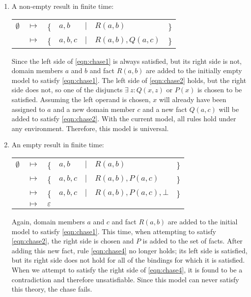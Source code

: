 		\begin{enumerate}
		\item A non-empty result in finite time:

			\begin{tabular}{lllllll}
				$\emptyset$ & $\mapsto$ & \{ & $a,b$   & $\mid$ & $R(a,b)$         & \} \\
				{}          & $\mapsto$ & \{ & $a,b,c$ & $\mid$ & $R(a,b), Q(a,c)$ & \}
			\end{tabular}

			Since the left side of \eqref{eqn:chase1} is always satisfied, but
			its right side is not, domain members $a$ and $b$ and fact $R(a,b)$
			are added to the initially empty model to satisfy \eqref{eqn:chase1}.
			The left side of \eqref{eqn:chase2} holds, but the right side does
			not, so one of the disjuncts $\exists\ z : Q(x,z)$ or $P(x)$ is
			chosen to be satisfied. Assuming the left operand is chosen, $x$
			will already have been assigned to $a$ and a new domain member $c$
			and a new fact $Q(a,c)$ will be added to satisfy \eqref{eqn:chase2}.
			With the current model, all rules hold under any environment.
			Therefore, this model is universal.

		\item An empty result in finite time:

			\begin{tabular}{lllllll}
				$\emptyset$ & $\mapsto$ & \{ & $a,b$   & $\mid$ & $R(a,b)$               & \} \\
				{}          & $\mapsto$ & \{ & $a,b,c$ & $\mid$ & $R(a,b), P(a,c)$       & \} \\
				{}          & $\mapsto$ & \{ & $a,b,c$ & $\mid$ & $R(a,b), P(a,c), \bot$ & \} \\
				{}          & $\mapsto$ & \multicolumn{5}{l}{ $\varepsilon$ }
			\end{tabular}

			Again, domain members $a$ and $c$ and fact $R(a,b)$ are added to
			the initial model to satisfy \eqref{eqn:chase1}. This time, when
			attempting to satisfy \eqref{eqn:chase2}, the right side is chosen
			and $P$ is added to the set of facts. After adding this new fact,
			rule \eqref{eqn:chase4} no longer holds; its left side is
			satisfied, but its right side does not hold for all of the bindings
			for which it is satisfied. When we attempt to satisfy the right
			side of \eqref{eqn:chase4}, it is found to be a contradiction and
			therefore unsatisfiable. Since this model can never satisfy this
			theory, the chase fails.


\end{enumerate}
